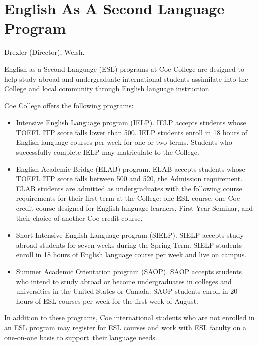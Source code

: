\documentclass[
  letterpaper,
]{scrbook}
\providecommand{\tightlist}{%
  \setlength{\itemsep}{0pt}\setlength{\parskip}{0pt}}
\begin{document}
\section{English As A Second Language
Program}\label{english-as-a-second-language-program}

Drexler (Director), Welsh.

English as a Second Language (ESL) programs at Coe College are designed
to help study abroad and undergraduate international students assimilate
into the College and local community through English language
instruction.

Coe College offers the following programs:

\begin{itemize}
\tightlist
\item
  Intensive English Language program (IELP). IELP accepts students whose
  TOEFL ITP score falls lower than 500. IELP students enroll in 18 hours
  of English language courses per week for one or two terms. Students
  who successfully complete IELP may matriculate to the College.
\item
  English Academic Bridge (ELAB) program. ELAB accepts students whose
  TOEFL ITP score falls between 500 and 520, the Admission requirement.
  ELAB students are admitted as undergraduates with the following course
  requirements for their first term at the College: one ESL course, one
  Coe-credit course designed for English language learners, First-Year
  Seminar, and their choice of another Coe-credit course.~
\item
  Short Intensive English Language program (SIELP). SIELP accepts study
  abroad students for seven weeks during the Spring Term. SIELP students
  enroll in 18 hours of English language course per week and live on
  campus.
\item
  Summer Academic Orientation program (SAOP). SAOP accepts students who
  intend to study abroad or become undergraduates in colleges and
  universities in the United States or Canada. SAOP students enroll in
  20 hours of ESL courses per week for the first week of August.
\end{itemize}

In addition to these programs, Coe international students who are not
enrolled in an ESL program may register for ESL courses and work with
ESL faculty on a one-on-one basis to support~their language needs.
\end{document}
